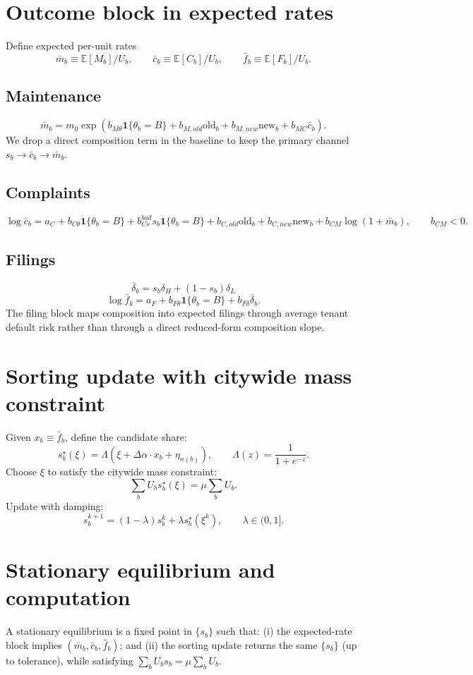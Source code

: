 \documentclass[11pt]{article}
\begin{document}
\section{Outcome block in expected rates}
Define expected per-unit rates
\[
\bar m_b \equiv \mathbb{E}[M_b]/U_b,\qquad
\bar c_b \equiv \mathbb{E}[C_b]/U_b,\qquad
\bar f_b \equiv \mathbb{E}[F_b]/U_b.
\]

\subsection{Maintenance}
\[
\bar m_b = m_0\exp\!\left(b_{M\theta}\mathbf 1\{\theta_b=B\} + b_{M,old}\mathrm{old}_b + b_{M,new}\mathrm{new}_b + b_{MC}\bar c_b\right).
\]
We drop a direct composition term in the baseline to keep the primary channel $s_b\rightarrow \bar c_b \rightarrow \bar m_b$.

\subsection{Complaints}
\[
\log \bar c_b = a_C + b_{C\theta}\mathbf 1\{\theta_b=B\} + b_{Cs}^{bad}s_b\mathbf 1\{\theta_b=B\} + b_{C,old}\mathrm{old}_b + b_{C,new}\mathrm{new}_b + b_{CM}\log(1+\bar m_b),
\qquad b_{CM}<0.
\]

\subsection{Filings}
\[
\bar\delta_b = s_b\delta_H + (1-s_b)\delta_L
\]
\[
\log \bar f_b = a_F + b_{F\theta}\mathbf 1\{\theta_b=B\} + b_{F\delta}\bar\delta_b.
\]
The filing block maps composition into expected filings through average tenant default risk rather than through a direct reduced-form composition slope.

\section{Sorting update with citywide mass constraint}
Given $x_b\equiv \bar f_b$, define the candidate share:
\[
s_b^\star(\xi)=\Lambda\!\left(\xi + \Delta\alpha\cdot x_b + \eta_{n(b)}\right),\qquad \Lambda(z)=\frac{1}{1+e^{-z}}.
\]
Choose $\xi$ to satisfy the citywide mass constraint:
\[
\sum_b U_b s_b^\star(\xi) = \mu \sum_b U_b.
\]
Update with damping:
\[
s_b^{k+1} = (1-\lambda)s_b^{k} + \lambda s_b^\star(\xi^k),
\qquad \lambda\in(0,1].
\]

\section{Stationary equilibrium and computation}
A stationary equilibrium is a fixed point in $\{s_b\}$ such that: (i) the expected-rate block implies $(\bar m_b,\bar c_b,\bar f_b)$; and (ii) the sorting update returns the same $\{s_b\}$ (up to tolerance), while satisfying $\sum_b U_b s_b=\mu\sum_b U_b$.
\end{document}

